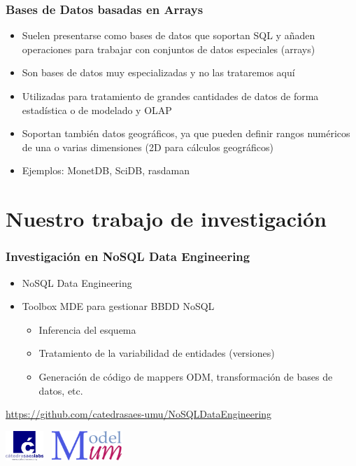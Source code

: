 \documentclass[14pt]{beamer}
\begin{document}
\begin{frame}[allowframebreaks]
  \frametitle{Bases de Datos basadas en Arrays}
  \begin{itemize}
\item Suelen presentarse como bases de datos que soportan SQL y añaden
  operaciones para trabajar con conjuntos de datos especiales (arrays)
\item Son bases de datos muy especializadas y no las trataremos aquí
\item Utilizadas para tratamiento de grandes cantidades de datos de forma
  estadística o de modelado y OLAP
\item Soportan también datos geográficos, ya que pueden definir rangos
  numéricos de una o varias dimensiones (2D para cálculos geográficos)
\item Ejemplos: MonetDB, SciDB, rasdaman
  \end{itemize}
\end{frame}


\section{Nuestro trabajo de investigación}

\begin{frame}
  \frametitle{Investigación en NoSQL Data Engineering}

  \begin{itemize}
  \item NoSQL Data Engineering
  \item Toolbox MDE para gestionar BBDD NoSQL
    \begin{itemize}
    \item Inferencia del esquema
    \item Tratamiento de la variabilidad de entidades (versiones)
    \item Generación de código de mappers ODM, transformación de bases de
      datos, etc.
    \end{itemize}
  \end{itemize}

  \url{https://github.com/catedrasaes-umu/NoSQLDataEngineering}

\centering  \includegraphics[height=3em]{img/logo_catedra}%
  ~\includegraphics[height=3em]{img/logo_modelum}

\end{frame}
\end{document}
